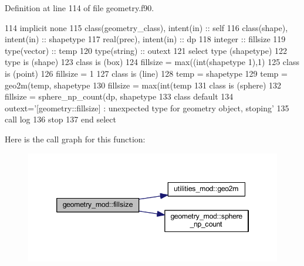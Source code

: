 Definition at line 114 of file geometry.\+f90.


\begin{DoxyCode}
114     \textcolor{keywordtype}{implicit none}
115     \textcolor{keywordtype}{class}(geometry\_class), \textcolor{keywordtype}{intent(in)} :: self
116     \textcolor{keywordtype}{class}(shape), \textcolor{keywordtype}{intent(in)} :: shapetype
117     \textcolor{keywordtype}{real(prec)}, \textcolor{keywordtype}{intent(in)} :: dp
118     \textcolor{keywordtype}{integer} :: fillsize
119     \textcolor{keywordtype}{type}(vector) :: temp
120     \textcolor{keywordtype}{type}(string) :: outext
121     \textcolor{keywordflow}{select type} (shapetype)
122 \textcolor{keywordflow}{    type is} (shape)
123 \textcolor{keywordflow}{    class is} (box)
124         fillsize = max((int(shapetype%
      1),1)
125 \textcolor{keywordflow}{    class is} (point)
126         fillsize = 1
127 \textcolor{keywordflow}{    class is} (line)
128         temp = shapetype%
129         temp = geo2m(temp, shapetype%
130         fillsize = max(int(temp%
131 \textcolor{keywordflow}{    class is} (sphere)
132         fillsize = sphere\_np\_count(dp, shapetype%
133 \textcolor{keywordflow}{        class default}
134         outext=\textcolor{stringliteral}{'[geometry::fillsize] : unexpected type for geometry object, stoping'}
135         \textcolor{keyword}{call }log%
136         stop
137 \textcolor{keywordflow}{    end select}
\end{DoxyCode}
Here is the call graph for this function\+:
\nopagebreak
\begin{figure}[H]
\begin{center}
\leavevmode
\includegraphics[width=346pt]{namespacegeometry__mod_ad790edd694561b33dad20cfa3a14e8f2_cgraph}
\end{center}
\end{figure}
\mbox{\label{namespacegeometry__mod_a4a38edbff02aa0ff5f16a16c39bf778e}} 
